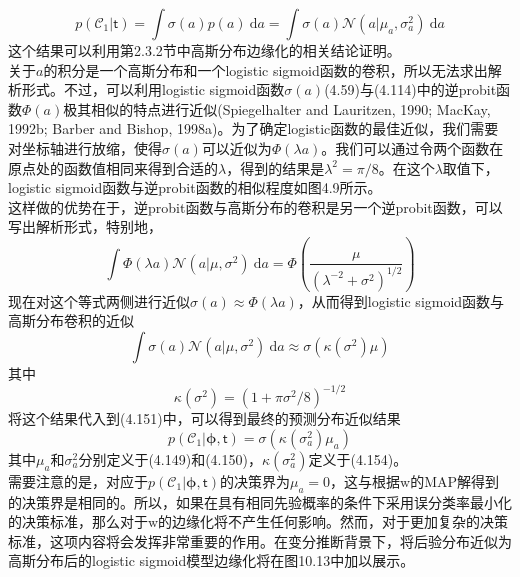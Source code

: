 \documentclass[b5paper]{book}
\numberwithin{equation}{chapter}
\newcommand {\bw} {\boldsymbol{\mathrm{w}}}
\newcommand {\sft} {\boldsymbol{\mathsf{t}}}
\newcommand {\rmd} {\mathrm{d}}
\newcommand {\bfphi} {\boldsymbol{\phi}}
\newcommand {\calN} {\mathcal{N}}
\newcommand {\calC} {\mathcal{C}}
\begin{document}
{\begin{equation}
		p(\calC_1|\sft) = \int \sigma(a) p(a)\ \rmd a = \int \sigma(a) \calN(a|\mu_a, \sigma_a^2)\ \rmd a
	\end{equation}
	这个结果可以利用第2.3.2节中高斯分布边缘化的相关结论证明。\\
	\indent 关于$a$的积分是一个高斯分布和一个logistic sigmoid函数的卷积，所以无法求出解析形式。不过，可以利用logistic sigmoid函数$\sigma(a)$(4.59)与(4.114)中的逆probit函数$\Phi(a)$极其相似的特点进行近似(Spiegelhalter and Lauritzen, 1990; MacKay, 1992b; Barber and Bishop, 1998a)。为了确定logistic函数的最佳近似，我们需要对坐标轴进行放缩，使得$\sigma(a)$可以近似为$\Phi(\lambda a)$。我们可以通过令两个函数在原点处的函数值相同来得到合适的$\lambda$，得到的结果是$\lambda^2 = \pi/8$。在这个$\lambda$取值下，logistic sigmoid函数与逆probit函数的相似程度如图4.9所示。\\
	\indent 这样做的优势在于，逆probit函数与高斯分布的卷积是另一个逆probit函数，可以写出解析形式，特别地，
	\begin{equation}
		\int \Phi(\lambda a)\calN(a|\mu, \sigma^2)\ \rmd a = \Phi\left(\frac{\mu}{(\lambda^{-2} + \sigma^2)^{1/2}}\right)
	\end{equation}
	现在对这个等式两侧进行近似$\sigma(a) \approx \Phi(\lambda a)$，从而得到logistic sigmoid函数与高斯分布卷积的近似
	\begin{equation}
		\int \sigma(a)\calN(a|\mu,\sigma^2)\ \rmd a \approx \sigma(\kappa(\sigma^2)\mu)
	\end{equation}
	其中
	\begin{equation}
		\kappa(\sigma^2) = (1 + \pi \sigma^2 /8)^{-1/2}
	\end{equation}
	\indent 将这个结果代入到(4.151)中，可以得到最终的预测分布近似结果
	\begin{equation}
		p(\calC_1|\bfphi,\sft) = \sigma\left(\kappa(\sigma_a^2)\mu_a\right)
	\end{equation}
	其中$\mu_a$和$\sigma_a^2$分别定义于(4.149)和(4.150)，$\kappa\left(\sigma_a^2\right)$定义于(4.154)。\\
	\indent 需要注意的是，对应于$p(\calC_1|\bfphi,\sft)$的决策界为$\mu_a = 0$，这与根据$\bw$的MAP解得到的决策界是相同的。所以，如果在具有相同先验概率的条件下采用误分类率最小化的决策标准，那么对于$\bw$的边缘化将不产生任何影响。然而，对于更加复杂的决策标准，这项内容将会发挥非常重要的作用。在变分推断背景下，将后验分布近似为高斯分布后的logistic sigmoid模型边缘化将在图10.13中加以展示。
	}
\end{document}

